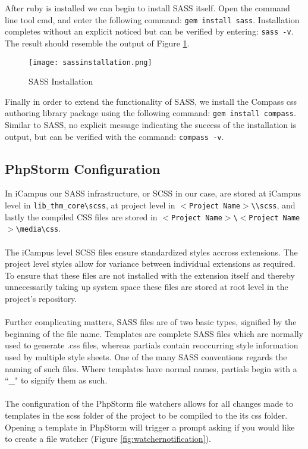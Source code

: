 \noindent
After ruby is installed we can begin to install SASS itself. Open the command line tool cmd, and enter the following command: \texttt{gem install sass}. Installation completes without an explicit noticed but can be verified by entering: \texttt{sass -v}. The result should resemble the output of Figure \ref{fig:sassinstallation}.\\

\begin{figure}[h] 
	\centering
	\texttt{[image: sassinstallation.png]}
	\caption{SASS Installation}
	\label{fig:sassinstallation}
\end{figure}

\noindent
Finally in order to extend the functionality of SASS, we install the Compass css authoring library package using the following command: \texttt{gem install compass}. Similar to SASS, no explicit message indicating the success of the installation is output, but can be verified with the command: \texttt{compass -v}.

\subsection{PhpStorm Configuration}

In iCampus our SASS infrastructure, or SCSS in our case, are stored at iCampus level in \texttt{lib\_thm\_core\textbackslash scss}, at project level in \texttt{$<$Project Name$>$\textbackslash \textbackslash scss}, and lastly the compiled CSS files are stored in \texttt{$<$Project Name$>$\textbackslash $<$Project Name$>$\textbackslash media\textbackslash css}.\\
\\
The iCampus level SCSS files ensure standardized styles accross extensions. The project level styles allow for variance between individual extensions as required. To ensure that these files are not installed with the extension itself and thereby unnecessarily taking up system space these files are stored at root level in the project's repository.\\
\\
Further complicating matters, SASS files are of two basic types, signified by the beginning of the file name. Templates are complete SASS files which are normally used to generate .css files, whereas partials contain reoccurring style information used by multiple style sheets. One of the many SASS conventions regards the naming of such files. Where templates have normal names, partials begin with a ``\_" to signify them as such.\\
\\
The configuration of the PhpStorm file watchers allows for all changes made to templates in the scss folder of the project to be compiled to the its css folder. Opening a template in PhpStorm will trigger a prompt asking if you would like to create a file watcher (Figure \ref{fig:watchernotification}).\\
\\


